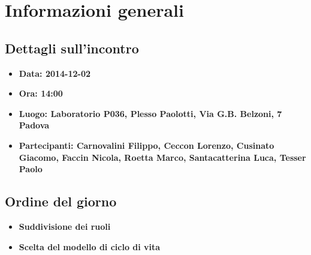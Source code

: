 %

\section{Informazioni generali}

	\subsection{Dettagli sull'incontro}
		\begin{itemize}
  			\item \bfseries{Data:} \textnormal{2014-12-02}
  			\item \bfseries{Ora:} \textnormal{14:00}
  			\item \bfseries{Luogo:} \textnormal{Laboratorio P036, Plesso Paolotti, Via G.B. Belzoni, 7 Padova}
  			\item \bfseries{Partecipanti:} \textnormal{Carnovalini Filippo, Ceccon Lorenzo, Cusinato Giacomo, Faccin Nicola, Roetta Marco, Santacatterina Luca, Tesser Paolo}
		\end{itemize}
		
	\subsection{Ordine del giorno}
		\begin{itemize}
			\item \bfseries{Suddivisione dei ruoli}
			\item \bfseries{Scelta del modello di ciclo di vita}
		\end{itemize}



